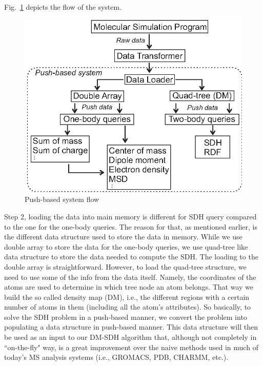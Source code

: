 \documentclass[10pt,journal,final,letterpaper,twocolumn]{IEEEtran}
\begin{document}
Fig.~\ref{fg:system} depicts the flow of the system.

\begin{figure}
 \centerline{ \includegraphics[width=.8\columnwidth]{images/system.eps} }
 \caption{Push-based system flow}
 \label{fg:system}
\end{figure}

Step 2, loading the data into main memory is different for SDH query
compared to the one for the one-body queries. The reason for that,
as mentioned earlier, is the different data structure used to store
the data in memory. While we use double array to store the data for
the one-body queries, we use quad-tree like data structure to store
the data needed to compute the SDH. The loading to the double array
is straightforward. However, to load the quad-tree structure, we
need to use some of the info from the data itself. Namely, the
coordinates of the atoms are used to determine in which tree node an
atom belongs. That way we build the so called density map (DM),
i.e., the different regions with a certain number of atoms in them
(including all the atom's attributes). So basically, to solve the
SDH problem in a push-based manner, we convert the problem into
populating a data structure in push-based manner. This data
structure will then be used as an input to our DM-SDH algorithm
that, although not completely in ``on-the-fly" way, is a great
improvement over the naive methods used in much of today's MS
analysis systems (i.e., GROMACS, PDB, CHARMM, etc.).
\end{document}

